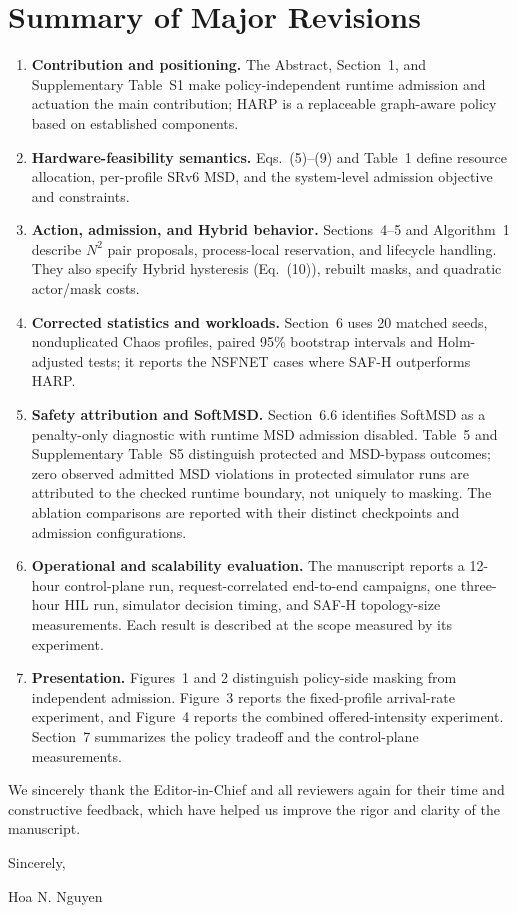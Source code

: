 \documentclass[11pt]{article}
\newcounter{reviewer}
\begin{document}
\section*{Summary of Major Revisions}
{\color{replyblue}
\begin{enumerate}
\item \textbf{Contribution and positioning.} The Abstract, Section~1, and Supplementary Table~S1 make policy-independent runtime admission and actuation the main contribution; HARP is a replaceable graph-aware policy based on established components.

\item \textbf{Hardware-feasibility semantics.} Eqs.~(5)--(9) and Table~1 define resource allocation, per-profile SRv6 MSD, and the system-level admission objective and constraints.
\item \textbf{Action, admission, and Hybrid behavior.} Sections~4--5 and Algorithm~1 describe \(N^2\) pair proposals, process-local reservation, and lifecycle handling. They also specify Hybrid hysteresis (Eq.~(10)), rebuilt masks, and quadratic actor/mask costs.
\item \textbf{Corrected statistics and workloads.} Section~6 uses 20 matched seeds, nonduplicated Chaos profiles, paired 95\% bootstrap intervals and Holm-adjusted tests; it reports the NSFNET cases where SAF-H outperforms HARP.

\item \textbf{Safety attribution and SoftMSD.} Section~6.6 identifies SoftMSD as a penalty-only diagnostic with runtime MSD admission disabled. Table~5 and Supplementary Table~S5 distinguish protected and MSD-bypass outcomes; zero observed admitted MSD violations in protected simulator runs are attributed to the checked runtime boundary, not uniquely to masking. The ablation comparisons are reported with their distinct checkpoints and admission configurations.
\item \textbf{Operational and scalability evaluation.} The manuscript reports a 12-hour control-plane run, request-correlated end-to-end campaigns, one three-hour HIL run, simulator decision timing, and SAF-H topology-size measurements. Each result is described at the scope measured by its experiment.
\item \textbf{Presentation.} Figures~1 and 2 distinguish policy-side masking from independent admission. Figure~3 reports the fixed-profile arrival-rate experiment, and Figure~4 reports the combined offered-intensity experiment. Section~7 summarizes the policy tradeoff and the control-plane measurements.
\end{enumerate}
}

We sincerely thank the Editor-in-Chief and all reviewers again for their time and constructive feedback, which have helped us improve the rigor and clarity of the manuscript.

\bigskip
Sincerely,

\vspace{2mm}
Hoa N. Nguyen
\end{document}
